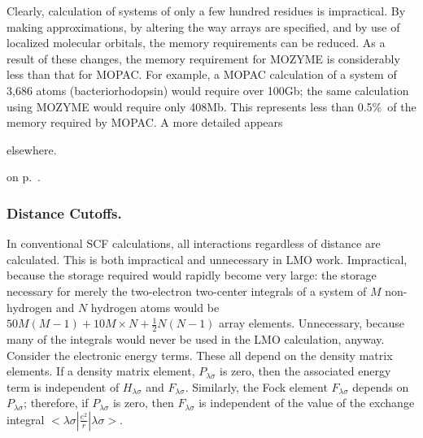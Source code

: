 Clearly, calculation of systems of only a few hundred residues is
impractical.   By making approximations, by altering the way arrays are
specified, and by use of localized molecular orbitals, the memory
requirements can be reduced. As a result of these changes, the memory
requirement for MOZYME is considerably less than that for MOPAC.  For
example, a MOPAC calculation of a system of 3,686 atoms
(bacteriorhodopsin)  would require over 100Gb; the same calculation
using MOZYME would require only 408Mb.  This represents less than
0.5\%\ of the memory required by MOPAC.  A more detailed
 appears
\begin{htmlonly}
elsewhere.
\end{htmlonly}
\begin{latexonly}
on p.~\pageref{newmat}.
\end{latexonly}


\subsubsection{Distance Cutoffs.}\label{cutoff}\label{m2el}
In conventional SCF calculations, all interactions regardless of distance are
calculated.  This is both impractical and unnecessary in LMO work. Impractical,
because the storage required would rapidly become very large: the storage
necessary for merely the two-electron two-center integrals of  a system of $M$
non-hydrogen and $N$ hydrogen atoms  would be $50M(M-1)+10M\times
N+\frac{1}{2}N(N-1)$ array elements. Unnecessary, because many of the integrals
would never be used in the LMO calculation, anyway.  Consider the electronic
energy terms.  These all depend on the  density matrix elements.  If a density
matrix element, $P_{\lambda\sigma}$  is zero, then the associated  energy term
is independent of $H_{\lambda\sigma}$ and $F_{\lambda\sigma}$. Similarly, the
Fock element $F_{\lambda\sigma}$ depends on $P_{\lambda\sigma}$; therefore, if
$P_{\lambda\sigma}$ is zero, then  $F_{\lambda\sigma}$ is independent of the
value of the exchange integral 
$<\!\lambda\sigma|\frac{e^2}{r}|\lambda\sigma\!>$.

